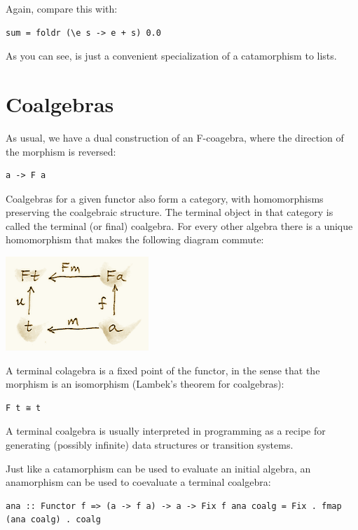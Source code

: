 Again, compare this with:

\begin{verbatim}
sum = foldr (\e s -> e + s) 0.0
\end{verbatim}

As you can see,  is just a convenient specialization of a
catamorphism to lists.

\section{Coalgebras}\label{coalgebras}

As usual, we have a dual construction of an F-coagebra, where the
direction of the morphism is reversed:

\begin{verbatim}
a -> F a
\end{verbatim}

Coalgebras for a given functor also form a category, with homomorphisms
preserving the coalgebraic structure. The terminal object
 in that category is called the terminal (or final)
coalgebra. For every other algebra  there is a unique
homomorphism  that makes the following diagram commute:

\includegraphics{images/alg7.png}

A terminal colagebra is a fixed point of the functor, in the sense that
the morphism  is an isomorphism
(Lambek's theorem for coalgebras):

\begin{verbatim}
F t ≅ t
\end{verbatim}

A terminal coalgebra is usually interpreted in programming as a recipe
for generating (possibly infinite) data structures or transition
systems.

Just like a catamorphism can be used to evaluate an initial algebra, an
anamorphism can be used to coevaluate a terminal coalgebra:

\begin{verbatim}
ana :: Functor f => (a -> f a) -> a -> Fix f ana coalg = Fix . fmap (ana coalg) . coalg
\end{verbatim}

